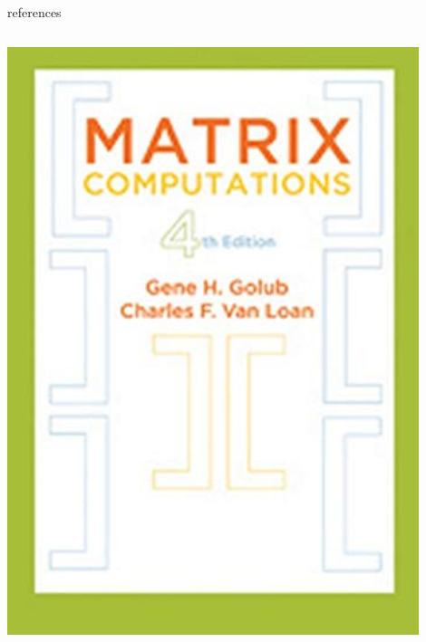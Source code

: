 \documentclass[10pt,
               svgnames,
               hyperref={colorlinks,citecolor=DeepPink4,linkcolor=FireBrick,urlcolor=Maroon},
               usepdftitle=false]{beamer}
\begin{document}
\begin{frame}{references}
\begin{columns}
\begin{column}{0.17\textwidth}
\hfill \includegraphics[width=0.9\textwidth]{images/golubvanloan.jpg}


\end{column}
\end{columns}
\end{frame}
\end{document}
